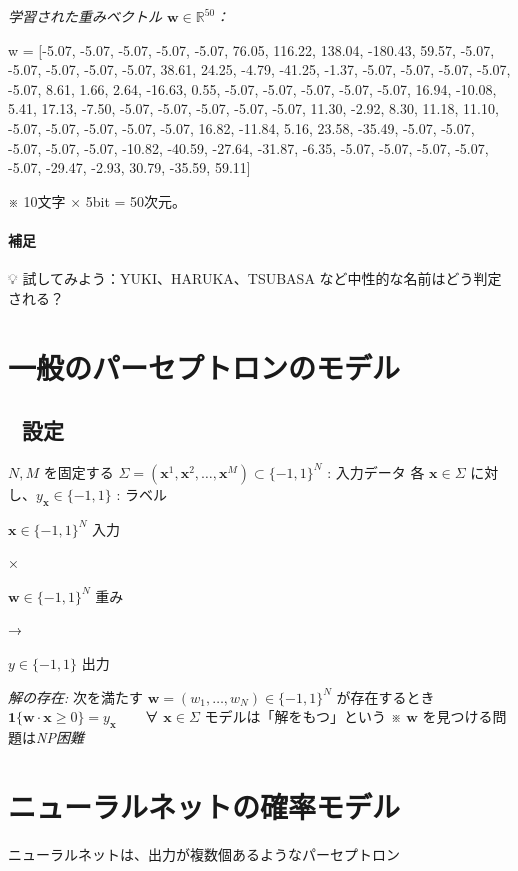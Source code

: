 \documentclass[uplatex,dvipdfmx,11pt,a4paper,openany]{bxjsbook}
\begin{document}
\emph{学習された重みベクトル \( \mathbf{w} \in \mathbb{R}^{50} \)：}

\allowbreak{}

w = [-5.07, -5.07, -5.07, -5.07, -5.07, 76.05, 116.22, 138.04, -180.43, 59.57, -5.07, -5.07, -5.07, -5.07, -5.07, 38.61, 24.25, -4.79, -41.25, -1.37, -5.07, -5.07, -5.07, -5.07, -5.07, 8.61, 1.66, 2.64, -16.63, 0.55, -5.07, -5.07, -5.07, -5.07, -5.07, 16.94, -10.08, 5.41, 17.13, -7.50, -5.07, -5.07, -5.07, -5.07, -5.07, 11.30, -2.92, 8.30, 11.18, 11.10, -5.07, -5.07, -5.07, -5.07, -5.07, 16.82, -11.84, 5.16, 23.58, -35.49, -5.07, -5.07, -5.07, -5.07, -5.07, -10.82, -40.59, -27.64, -31.87, -6.35, -5.07, -5.07, -5.07, -5.07, -5.07, -29.47, -2.93, 30.79, -35.59, 59.11]

※ 10文字 × 5bit = 50次元。

\paragraph{補足}
💡 試してみよう：YUKI、HARUKA、TSUBASA など中性的な名前はどう判定される？


\section{一般のパーセプトロンのモデル}
\subsection{📐 設定}
\( N, M \) を固定する\allowbreak{} 
                \( \Sigma = (\mathbf{x}^1, \mathbf{x}^2, \ldots, \mathbf{x}^M) \subset \{-1, 1\}^N \) : 入力データ\allowbreak{} 
                各 \( \mathbf{x} \in \Sigma \) に対し、\( y_{\mathbf{x}} \in \{-1, 1\} \) : ラベル

\( \mathbf{x} \in \{-1, 1\}^N \)\allowbreak{} 
入力

×

\( \mathbf{w} \in \{-1, 1\}^N \)\allowbreak{} 
重み

→

\( y \in \{-1, 1\} \)\allowbreak{} 
出力

\emph{解の存在:} 次を満たす \( \mathbf{w} = (w_1, \ldots, w_N) \in \{-1, 1\}^N \) が存在するとき\allowbreak{} 
\( \mathbf{1}\{ \mathbf{w} \cdot \mathbf{x} \ge 0 \} = y_{\mathbf{x}} \)　　∀ \( \mathbf{x} \in \Sigma \)\allowbreak{} 
            モデルは「解をもつ」という\allowbreak{} 
※ \( \mathbf{w} \) を見つける問題は\emph{NP困難}

\section{ニューラルネットの確率モデル}
ニューラルネットは、出力が複数個あるようなパーセプトロン
\end{document}
